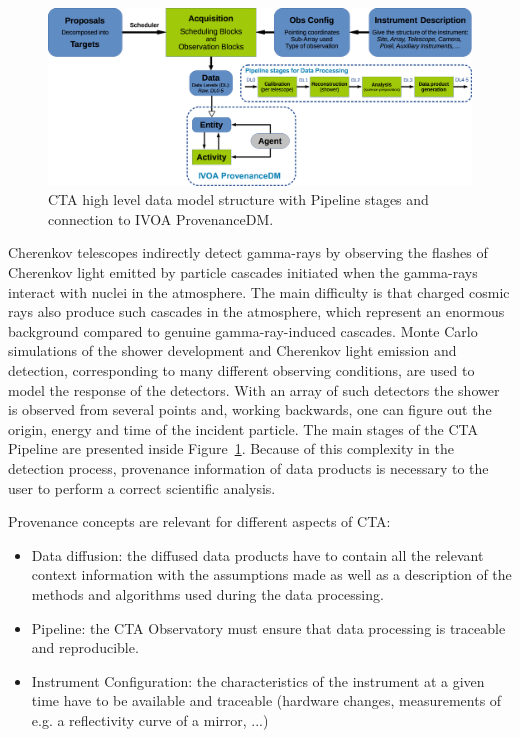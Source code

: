 \begin{figure}
\centering
\includegraphics[width=\textwidth]{CTA_DM_high_level.png}
\caption[CTA high level data model structure]{CTA high level data model structure with Pipeline stages and connection to IVOA ProvenanceDM.}
\label{fig:cta_dm}
\end{figure}

Cherenkov telescopes indirectly detect gamma-rays by observing the flashes of Cherenkov light emitted by particle cascades initiated when the gamma-rays interact with nuclei in the atmosphere. The main difficulty  is that charged cosmic rays also produce such cascades in the atmosphere, which represent an enormous background compared to genuine gamma-ray-induced cascades. Monte Carlo simulations of the shower development and Cherenkov light emission and detection, corresponding to many different observing conditions, are used to model the response of the detectors.  With an array of such detectors the shower is observed  from several points and, working backwards, one can figure out the origin, energy and time of the incident particle. The main stages of the CTA Pipeline are presented inside Figure~\ref{fig:cta_dm}. Because of this complexity in the detection process, provenance information of data products is necessary to the user to perform a correct scientific analysis.

Provenance concepts are relevant for different aspects of CTA:
\begin{itemize}
\item Data diffusion: the diffused data products have to contain all the relevant context information with the assumptions made as well as a description of the methods and algorithms used during the data processing.
\item Pipeline: the CTA Observatory must ensure that data processing is traceable and reproducible.
\item Instrument Configuration: the characteristics of the instrument at a given time have to be available and traceable (hardware changes, measurements of e.g. a reflectivity curve of a mirror, ...)
\end{itemize}

